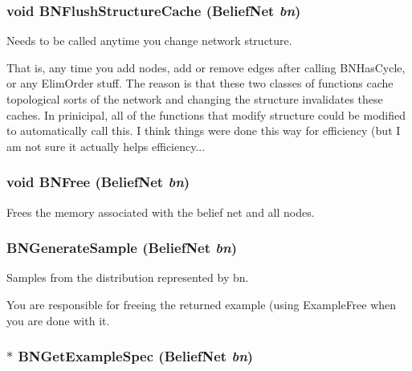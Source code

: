 \subsubsection{\setlength{\rightskip}{0pt plus 5cm}void BNFlush\-Structure\-Cache ({\bf Belief\-Net} {\em bn})}\label{BeliefNet_8h_a60}


Needs to be called anytime you change network structure. 

That is, any time you add nodes, add or remove edges after calling BNHas\-Cycle, or any Elim\-Order stuff. The reason is that these two classes of functions cache topological sorts of the network and changing the structure invalidates these caches. In prinicipal, all of the functions that modify structure could be modified to automatically call this. I think things were done this way for efficiency (but I am not sure it actually helps efficiency... 
\subsubsection{\setlength{\rightskip}{0pt plus 5cm}void BNFree ({\bf Belief\-Net} {\em bn})}\label{BeliefNet_8h_a46}


Frees the memory associated with the belief net and all nodes. 

\subsubsection{ BNGenerate\-Sample ({\bf Belief\-Net} {\em bn})}\label{BeliefNet_8h_a70}


Samples from the distribution represented by bn. 

You are responsible for freeing the returned example (using Example\-Free when you are done with it. 
\subsubsection{$\ast$ BNGet\-Example\-Spec ({\bf Belief\-Net} {\em bn})}\label{BeliefNet_8h_a53}


